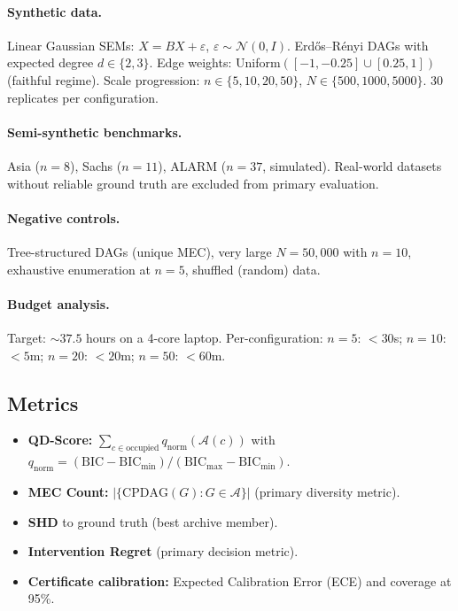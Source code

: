 \documentclass{article}
\theoremstyle{definition}
\theoremstyle{plain}
\theoremstyle{remark}
\begin{document}
\paragraph{Synthetic data.}
Linear Gaussian SEMs: $X = BX + \varepsilon$, $\varepsilon \sim \mathcal{N}(0, I)$.
Erd\H{o}s--R\'enyi DAGs with expected degree $d \in \{2, 3\}$.
Edge weights: Uniform$([-1, -0.25] \cup [0.25, 1])$ (faithful regime).
Scale progression: $n \in \{5, 10, 20, 50\}$, $N \in \{500, 1000, 5000\}$.
30 replicates per configuration.

\paragraph{Semi-synthetic benchmarks.}
Asia ($n = 8$), Sachs ($n = 11$), ALARM ($n = 37$, simulated).
Real-world datasets without reliable ground truth are excluded from primary
evaluation.

\paragraph{Negative controls.}
Tree-structured DAGs (unique MEC), very large $N = 50{,}000$ with $n = 10$,
exhaustive enumeration at $n = 5$, shuffled (random) data.

\paragraph{Budget analysis.}
Target: $\sim 37.5$ hours on a 4-core laptop. Per-configuration:
$n = 5$: $< 30$s; $n = 10$: $< 5$m; $n = 20$: $< 20$m; $n = 50$: $< 60$m.

\subsection{Metrics}

\begin{itemize}
  \item \textbf{QD-Score:}
    $\sum_{c \in \text{occupied}} q_{\text{norm}}(\mathcal{A}(c))$ with
    $q_{\text{norm}} = (\text{BIC} - \text{BIC}_{\min}) / (\text{BIC}_{\max} - \text{BIC}_{\min})$.
  \item \textbf{MEC Count:}
    $|\{\text{CPDAG}(G) : G \in \mathcal{A}\}|$ (primary diversity metric).
  \item \textbf{SHD} to ground truth (best archive member).
  \item \textbf{Intervention Regret} (primary decision metric).
  \item \textbf{Certificate calibration:}
    Expected Calibration Error (ECE) and coverage at 95\%.
\end{itemize}
\end{document}

